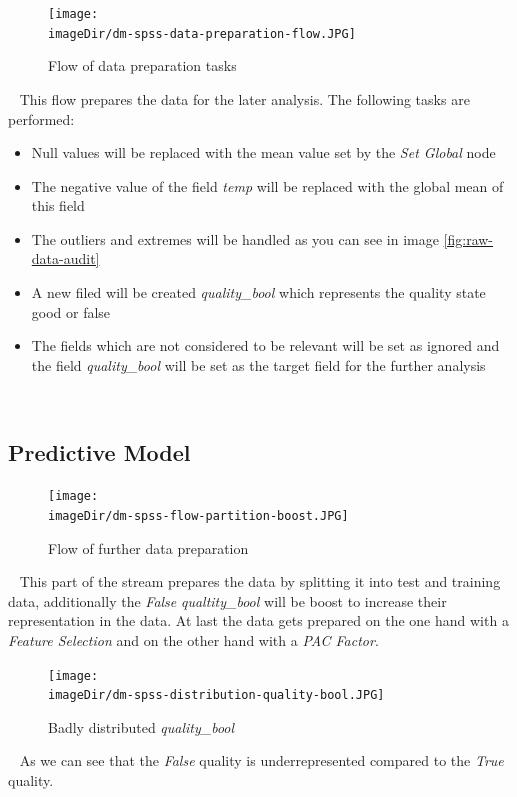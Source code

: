 \documentclass[11pt, a4paper, twoside]{article}   	%
\newcommand{\imageDir}{./images/}
\begin{document}
\begin{figure}[h]
\centering
\texttt{[image: \\imageDir/dm-spss-data-preparation-flow.JPG]}
\caption{Flow of data preparation tasks}
\end{figure}
\ \newline
This flow prepares the data for the later analysis. The following tasks are performed:
\begin{itemize}
	\item Null values will be replaced with the mean value set by the \emph{Set Global} node
	\item The negative value of the field \emph{temp} will be replaced with the global mean of this field
	\item The outliers and extremes will be handled as you can see in image \ref{fig:raw-data-audit}
	\item A new filed will be created \emph{quality\_bool} which represents the quality state good or false
	\item The fields which are not considered to be relevant will be set as ignored and the field \emph{quality\_bool} will be set as the target field for the further analysis
\end{itemize}
\ \newpage

\subsection{Predictive Model}
\begin{figure}[h]
\centering
\texttt{[image: \\imageDir/dm-spss-flow-partition-boost.JPG]}
\caption{Flow of further data preparation}
\end{figure}
\ \newline
This part of the stream prepares the data by splitting it into test and training data, additionally the \emph{False} \emph{qualtity\_bool} will be boost to increase their representation in the data. At last the data gets prepared on the one hand with a \emph{Feature Selection} and on the other hand with a \emph{PAC Factor}.
\newline
\newline
\begin{figure}[h]
\centering
\texttt{[image: \\imageDir/dm-spss-distribution-quality-bool.JPG]}
\caption{Badly distributed \emph{quality\_bool}}
\end{figure}
\ \newline
As we can see that the \emph{False} quality is underrepresented compared to the \emph{True} quality.
\ \newpage
\end{document}
